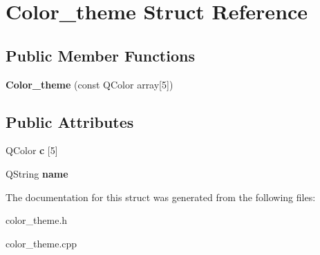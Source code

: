 \hypertarget{struct_color__theme}{\section{Color\-\_\-theme Struct Reference}
\label{struct_color__theme}
}
\subsection*{Public Member Functions}
\begin{DoxyCompactItemize}
\item 
\hypertarget{struct_color__theme_ad7958bf1cce7b96eb8c8726390a8b510}{{\bfseries Color\-\_\-theme} (const Q\-Color array\mbox{[}5\mbox{]})}\label{struct_color__theme_ad7958bf1cce7b96eb8c8726390a8b510}

\end{DoxyCompactItemize}
\subsection*{Public Attributes}
\begin{DoxyCompactItemize}
\item 
\hypertarget{struct_color__theme_ab5a1de0f04224abfe2942e614c2657b1}{Q\-Color {\bfseries c} \mbox{[}5\mbox{]}}\label{struct_color__theme_ab5a1de0f04224abfe2942e614c2657b1}

\item 
\hypertarget{struct_color__theme_a008de361633246354c382c2285e031de}{Q\-String {\bfseries name}}\label{struct_color__theme_a008de361633246354c382c2285e031de}

\end{DoxyCompactItemize}


The documentation for this struct was generated from the following files\-:\begin{DoxyCompactItemize}
\item 
color\-\_\-theme.\-h\item 
color\-\_\-theme.\-cpp\end{DoxyCompactItemize}
